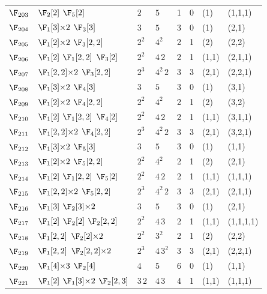 \begin{landscape}
{\begin{longtable}{@{}l p{8.2cm} l l r r l l@{}}
$\F_{203}$ & $\F_{2}[2]$\; $\F_{5}[2]$ & $2$ & $5$ & 1 & 0 & (1) & (1,1,1) \\
$\F_{204}$ & $\F_{1}[3]{\times}2$\; $\F_{3}[3]$ & $3$ & $5$ & 3 & 0 & (1) & (2,1) \\
$\F_{205}$ & $\F_{1}[2]{\times}2$\; $\F_{3}[2,2]$ & $2^{2}$ & $4^{2}$ & 2 & 1 & (2) & (2,2) \\
$\F_{206}$ & $\F_{1}[2]$\; $\F_{1}[2,2]$\; $\F_{3}[2]$ & $2^{2}$ & $4$\,$2$ & 2 & 1 & (1,1) & (2,1,1) \\
$\F_{207}$ & $\F_{1}[2,2]{\times}2$\; $\F_{3}[2,2]$ & $2^{3}$ & $4^{2}$\,$2$ & 3 & 3 & (2,1) & (2,2,1) \\
$\F_{208}$ & $\F_{1}[3]{\times}2$\; $\F_{4}[3]$ & $3$ & $5$ & 3 & 0 & (1) & (3,1) \\
$\F_{209}$ & $\F_{1}[2]{\times}2$\; $\F_{4}[2,2]$ & $2^{2}$ & $4^{2}$ & 2 & 1 & (2) & (3,2) \\
$\F_{210}$ & $\F_{1}[2]$\; $\F_{1}[2,2]$\; $\F_{4}[2]$ & $2^{2}$ & $4$\,$2$ & 2 & 1 & (1,1) & (3,1,1) \\
$\F_{211}$ & $\F_{1}[2,2]{\times}2$\; $\F_{4}[2,2]$ & $2^{3}$ & $4^{2}$\,$2$ & 3 & 3 & (2,1) & (3,2,1) \\
$\F_{212}$ & $\F_{1}[3]{\times}2$\; $\F_{5}[3]$ & $3$ & $5$ & 3 & 0 & (1) & (1,1) \\
$\F_{213}$ & $\F_{1}[2]{\times}2$\; $\F_{5}[2,2]$ & $2^{2}$ & $4^{2}$ & 2 & 1 & (2) & (2,1) \\
$\F_{214}$ & $\F_{1}[2]$\; $\F_{1}[2,2]$\; $\F_{5}[2]$ & $2^{2}$ & $4$\,$2$ & 2 & 1 & (1,1) & (1,1,1) \\
$\F_{215}$ & $\F_{1}[2,2]{\times}2$\; $\F_{5}[2,2]$ & $2^{3}$ & $4^{2}$\,$2$ & 3 & 3 & (2,1) & (2,1,1) \\
$\F_{216}$ & $\F_{1}[3]$\; $\F_{2}[3]{\times}2$ & $3$ & $5$ & 3 & 0 & (1) & (2,1) \\
$\F_{217}$ & $\F_{1}[2]$\; $\F_{2}[2]$\; $\F_{2}[2,2]$ & $2^{2}$ & $4$\,$3$ & 2 & 1 & (1,1) & (1,1,1,1) \\
$\F_{218}$ & $\F_{1}[2,2]$\; $\F_{2}[2]{\times}2$ & $2^{2}$ & $3^{2}$ & 2 & 1 & (2) & (2,2) \\
$\F_{219}$ & $\F_{1}[2,2]$\; $\F_{2}[2,2]{\times}2$ & $2^{3}$ & $4$\,$3^{2}$ & 3 & 3 & (2,1) & (2,2,1) \\
$\F_{220}$ & $\F_{1}[4]{\times}3$\; $\F_{2}[4]$ & $4$ & $5$ & 6 & 0 & (1) & (1,1) \\
$\F_{221}$ & $\F_{1}[2]$\; $\F_{1}[3]{\times}2$\; $\F_{2}[2,3]$ & $3$\,$2$ & $4$\,$3$ & 4 & 1 & (1,1) & (1,1,1) \\

\end{longtable}}
\end{landscape}
